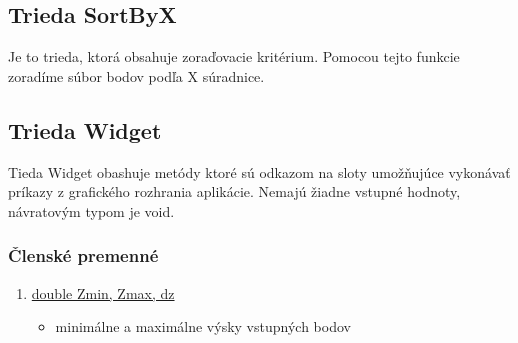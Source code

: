 \documentclass[12pt]{article}
\begin{document}
\subsection{Trieda SortByX}
Je to trieda, ktorá obsahuje zoraďovacie kritérium. Pomocou tejto funkcie zoradíme súbor bodov podľa X súradnice.

\subsection{Trieda Widget}
Tieda Widget obashuje metódy ktoré sú odkazom na sloty umožňujúce vykonávať príkazy z grafického rozhrania aplikácie. Nemajú žiadne vstupné hodnoty, návratovým typom je void.

\subsubsection{Členské premenné}
\begin{enumerate}
\item[] \underline {double Zmin, Zmax, dz}
\begin{itemize}
\item minimálne a maximálne výsky vstupných bodov
\end{itemize}
\end{enumerate}
\end{document}
